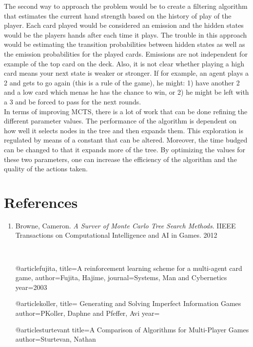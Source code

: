\documentclass[11pt]{article}
\begin{document}
 The second way to approach the problem would be to create a filtering algorithm that estimates the current hand strength based on the history of play of the player. Each card played would be considered an emission and the hidden states would be the players hands after each time it plays. The trouble in this approach would be estimating the transition probabilities between hidden states as well as the emission probabilities for the played cards. Emissions are not independent for example of the top card on the deck. Also, it is not clear whether playing a high card means your next state is weaker or stronger. If for example, an agent plays a 2 and gets to go again (this is a rule of the game), he might: 1) have another 2 and a low card which menas he has the chance to win, or 2) he might be left with a 3 and be forced to pass for the next rounds.\\

In terms of improving MCTS, there is a lot of work that can be done refining the different parameter values. The performance of the algorithm is dependent on how well it selects nodes in the tree and then expands them. This exploration is regulated by means of a constant that can be altered. Moreover, the time budged can be changed to that it expands more of the tree. By optimizing the values for these two parameters, one can increase the efficiency of the algorithm and the quality of the actions taken.

\section{References}

\begin{enumerate}
\item Browne, Cameron. \textit{A Surver of Monte Carlo Tree Search Methods}. IIEEE Transactions on Computational Intelligence and AI in Games. 2012

\

@article{fujita,
  title={A reinforcement learning scheme for a multi-agent card game},
  author={Fujita, Hajime},
  journal={Systems, Man and Cybernetics}
  year={2003}
}

@article{koller,
	title= {Generating and Solving Imperfect Information Games}
	author=P{Koller, Daphne and Pfeffer, Avi}
	year={}
}

@article{sturtevant
	title={A Comparison of Algorithms for Multi-Player Games}
	author={Sturtevan, Nathan}
}

\end{enumerate}
\end{document}
